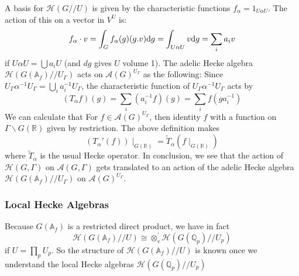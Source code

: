 \documentclass[11pt,english]{smfart}
\theoremstyle{definition}
\theoremstyle{remark}
\renewcommand{\tilde}{\widetilde}
\begin{document}
A basis for $ \mathcal{H}(G / / U) $ is given by the characteristic functions $ f_{\alpha}=1_{U \alpha U} $. The action of this on a vector in $ V^{U} $ is:
\[
f_{\alpha} \cdot v=\int_{G} f_{\alpha}(g)  (g.v)  \mathrm{d} g \\
=\int_{U \alpha U} v \mathrm{d} g=\sum_{i} a_{i} v
\]
if $ U \alpha U=\bigcup a_{i} U $ (and $ d g $ gives $ U $ volume 1).
The adelic Hecke algebra $ \mathcal{H}\left(G\left(\mathbb{A}_{f}\right) / / U_{\Gamma}\right) $ acts on $ \mathcal{A}(G)^{U_{\Gamma}} $ as the following:
Since $ U_{\Gamma} \alpha^{-1} U_{\Gamma}=\bigcup_{i} a_{i}^{-1} U_{\Gamma} $, the characteristic function of $ U_{\Gamma} \alpha^{-1} U_{\Gamma} $ acts by
\[\left(T_{\alpha} f\right)(g)=\sum_{i}\left(a_{i}^{-1} f\right)(g)=\sum_{i} f\left(g a_{i}^{-1}\right)\]
We can calculate that For $f\in \mathcal{A}(G)^{U_{\Gamma}}$, then identity $f$ with a function on $\Gamma \backslash G(\mathbb{R})$ given by restriction.
The above definition makes
\[ (T_\alpha '(f)) \mid _{G(\mathbb{R})} =\tilde{T}_\alpha (f\mid _{G(\mathbb{R})}) \]
where $\tilde{T}_\alpha$ is the usual Hecke operator. In conclusion, we see that the action of $ \mathcal{H}(G, \Gamma) $ on $\mathcal{A}(G, \Gamma) $ gets translated to an action of the adelic Hecke algebra $ \mathcal{H}\left(G\left(\mathbb{A}_{f}\right) / / U_{\Gamma}\right) $ on $ \mathcal{A}(G)^{U_{\Gamma}} $.
\subsubsection{Local Hecke Algebras}
Because $ G\left(\mathbb{A}_{f}\right) $ is a restricted direct product, we have in fact
\[\mathcal{H}\left(G\left(\mathbb{A}_{f}\right) / / U\right) \cong \otimes_{v}^{\prime} \mathcal{H}\left(G\left(\mathbb{Q}_{p}\right) / / U_{p}\right)\]
if $ U=\prod_{p} U_{p} $. So the structure of $ \mathcal{H}\left(G\left(\mathbb{A}_{f}\right) / / U\right) $ is known once we understand the local Hecke algebras $ \mathcal{H}\left(G\left(\mathbb{Q}_{p}\right) / / U_{p}\right) $
\end{document}
